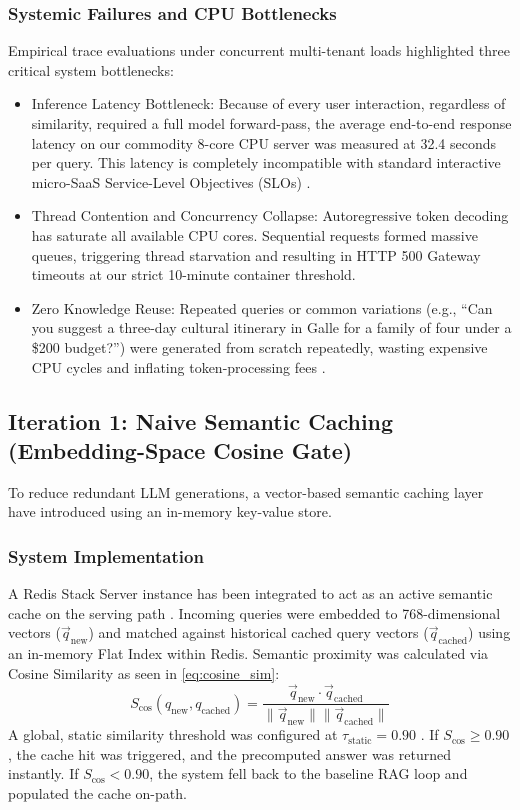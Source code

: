 \documentclass{ieeeaccess}
\begin{document}
\subsubsection{Systemic Failures and CPU Bottlenecks}
Empirical trace evaluations under concurrent multi-tenant loads highlighted three critical system bottlenecks:
\begin{itemize}
    \item{Inference Latency Bottleneck}: Because of every user interaction, regardless of similarity, required a full model forward-pass, the average end-to-end response latency on our commodity 8-core CPU server was measured at {32.4 seconds per query}. This latency is completely incompatible with standard interactive micro-SaaS Service-Level Objectives (SLOs) \cite{devalla-microservice-rag-2025, behera-optimizing-irjmets-2025}.
    \item{Thread Contention and Concurrency Collapse}: Autoregressive token decoding has saturate all available CPU cores. Sequential requests formed massive queues, triggering thread starvation and resulting in HTTP 500 Gateway timeouts at our strict 10-minute container threshold.
    \item{Zero Knowledge Reuse}: Repeated queries or common variations (e.g., ``Can you suggest a three-day cultural itinerary in Galle for a family of four under a \$200 budget?'') were generated from scratch repeatedly, wasting expensive CPU cycles and inflating token-processing fees \cite{couturier-contextual-summaries-2025, singh-krites-2026}.
\end{itemize}

\subsection{Iteration 1: Naive Semantic Caching (Embedding-Space Cosine Gate)}
To reduce redundant LLM generations, a vector-based semantic caching layer have introduced using an in-memory key-value store.

\subsubsection{System Implementation}
A Redis Stack Server instance has been integrated to act as an active semantic cache on the serving path \cite{bang-gptcache-2023}. Incoming queries were embedded to 768-dimensional vectors ($\vec{q}_{\text{new}}$) and matched against historical cached query vectors ($\vec{q}_{\text{cached}}$) using an in-memory Flat Index within Redis. Semantic proximity was calculated via Cosine Similarity as seen in \eqref{eq:cosine_sim}:
\begin{equation}
\label{eq:cosine_sim}
    S_{\text{cos}}(q_{\text{new}}, q_{\text{cached}}) = \frac{\vec{q}_{\text{new}} \cdot \vec{q}_{\text{cached}}}{\|\vec{q}_{\text{new}}\| \|\vec{q}_{\text{cached}}\|}
\end{equation}
A global, static similarity threshold was configured at $\tau_{\text{static}} = 0.90$ \cite{biton-exact-hits-2025}. If $S_{\text{cos}} \ge 0.90$, the cache hit was triggered, and the precomputed answer was returned instantly. If $S_{\text{cos}} < 0.90$, the system fell back to the baseline RAG loop and populated the cache on-path.
\end{document}
